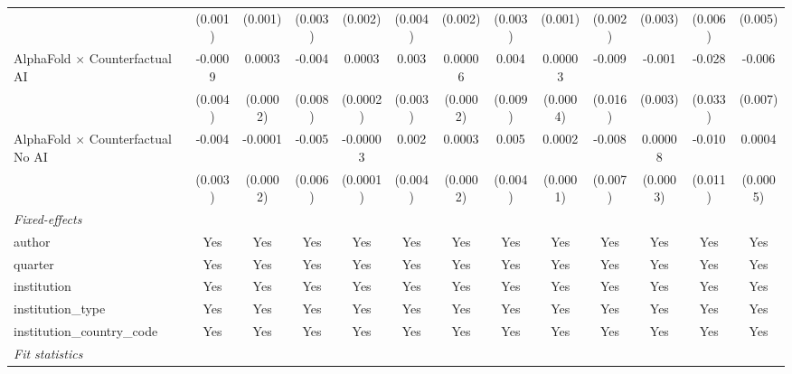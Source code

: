 \begin{tabular}{lcccccccccccc}
                                            & (0.001)       & (0.001)        & (0.003)       & (0.002)       & (0.004) & (0.002)  & (0.003) & (0.001)  & (0.002)       & (0.003)       & (0.006) & (0.005)\\   
   AlphaFold $\times$ Counterfactual AI     & -0.0009       & 0.0003         & -0.004        & 0.0003        & 0.003   & 0.00006  & 0.004   & 0.00003  & -0.009        & -0.001        & -0.028  & -0.006\\   
                                            & (0.004)       & (0.0002)       & (0.008)       & (0.0002)      & (0.003) & (0.0002) & (0.009) & (0.0004) & (0.016)       & (0.003)       & (0.033) & (0.007)\\   
   AlphaFold $\times$ Counterfactual No AI  & -0.004        & -0.0001        & -0.005        & -0.00003      & 0.002   & 0.0003   & 0.005   & 0.0002   & -0.008        & 0.00008       & -0.010  & 0.0004\\   
                                            & (0.003)       & (0.0002)       & (0.006)       & (0.0001)      & (0.004) & (0.0002) & (0.004) & (0.0001) & (0.007)       & (0.0003)      & (0.011) & (0.0005)\\   
   \midrule
   \emph{Fixed-effects}\\
   author                                   & Yes           & Yes            & Yes           & Yes           & Yes     & Yes      & Yes     & Yes      & Yes           & Yes           & Yes     & Yes\\  
   quarter                                  & Yes           & Yes            & Yes           & Yes           & Yes     & Yes      & Yes     & Yes      & Yes           & Yes           & Yes     & Yes\\  
   institution                              & Yes           & Yes            & Yes           & Yes           & Yes     & Yes      & Yes     & Yes      & Yes           & Yes           & Yes     & Yes\\  
   institution\_type                        & Yes           & Yes            & Yes           & Yes           & Yes     & Yes      & Yes     & Yes      & Yes           & Yes           & Yes     & Yes\\  
   institution\_country\_code               & Yes           & Yes            & Yes           & Yes           & Yes     & Yes      & Yes     & Yes      & Yes           & Yes           & Yes     & Yes\\  
   \midrule
   \emph{Fit statistics}\\

\end{tabular}
